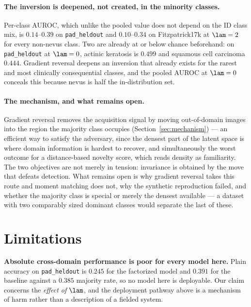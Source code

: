 \paragraph{The inversion is deepened, not created, in the minority classes.}
\label{sec:perclass}
Per-class AUROC, which unlike the pooled value does not depend on the ID class mix,
is $0.14$--$0.39$ on \texttt{pad\_heldout} and $0.10$--$0.34$ on Fitzpatrick17k at
$\lam = 2$ for every non-nevus class. Two are already at or below chance beforehand: on
\texttt{pad\_heldout} at $\lam = 0$, actinic keratosis is $0.499$ and squamous cell
carcinoma $0.444$.
Gradient reversal deepens an inversion that already exists for the rarest and most
clinically consequential classes, and the pooled AUROC at $\lam = 0$ conceals this
because nevus is half the in-distribution set.

\paragraph{The mechanism, and what remains open.}
Gradient reversal removes the acquisition signal by moving out-of-domain images into
the region the majority class occupies (Section~\ref{sec:mechanism}) --- an efficient
way to satisfy the adversary, since the densest part of the latent space is where
domain information is hardest to recover, and simultaneously the worst outcome for a
distance-based novelty score, which reads density as familiarity. The two objectives
are not merely in tension: invariance is obtained by the move that defeats detection.
What remains open is why gradient reversal takes this route and moment matching does
not, why the synthetic reproduction failed, and whether the majority class is special
or merely the densest available --- a dataset with two comparably sized dominant
classes would separate the last of these.

\section{Limitations}
\label{sec:limitations}

\textbf{Absolute cross-domain performance is poor for every model here.} Plain
accuracy on \texttt{pad\_heldout} is $0.245$ for the factorized model and $0.391$ for
the baseline against a $0.385$ majority rate, so no model here is deployable. Our
claim concerns the \emph{effect of $\lam$}, and the deployment pathway above is a
mechanism of harm rather than a description of a fielded system.

